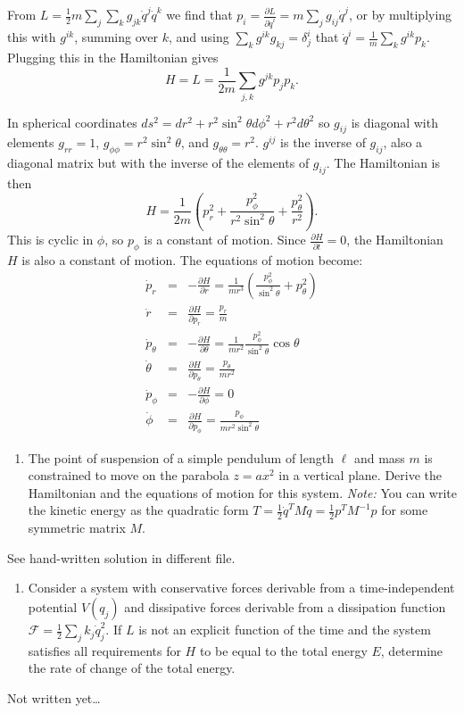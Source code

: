 \documentclass[letterpaper,11pt]{article}
\begin{document}
From $L = \frac{1}{2} m \sum_j \sum_k g_{jk} \dot{q}^j \dot{q}^k$ we find that $p_i = \frac{\partial L}{\partial \dot{q}^i} = m \sum_j g_{ij} \dot{q}^j$, or by multiplying this with $g^{ik}$, summing over $k$, and using $\sum_k g^{ik} g_{kj} = \delta^i_j$ that $\dot{q}^i = \frac{1}{m} \sum_k g^{ik} p_k$.  Plugging this in the Hamiltonian gives $$H = L = \frac{1}{2m} \sum_{j,k} g^{jk} p_j p_k.$$

In spherical coordinates $ds^2 = dr^2 + r^2 \sin^2\theta d\phi^2 + r^2 d\theta^2$ so $g_{ij}$ is diagonal with elements $g_{rr} = 1$, $g_{\phi\phi} = r^2 \sin^2\theta$, and $g_{\theta\theta} = r^2$.  $g^{ij}$ is the inverse of $g_{ij}$, also a diagonal matrix but with the inverse of the elements of $g_{ij}$.  The Hamiltonian is then $$H = \frac{1}{2m} (p_r^2 + \frac{p_\phi^2}{r^2\sin^2\theta} + \frac{p_\theta^2}{r^2}).$$  This is cyclic in $\phi$, so $p_\phi$ is a constant of motion.  Since $\frac{\partial H}{\partial t} = 0$, the Hamiltonian $H$ is also a constant of motion.  The equations of motion become:
\begin{eqnarray*}
 \dot{p}_r & = & -\frac{\partial H}{\partial r} = \frac{1}{mr^3}(\frac{p_\phi^2}{\sin^2\theta} + p_\theta^2) \\
 \dot{r} & = & \frac{\partial H}{\partial p_r} = \frac{p_r}{m} \\
 \dot{p}_\theta & = & -\frac{\partial H}{\partial \theta} =  \frac{1}{mr^2}\frac{p_\phi^2}{\sin^2\theta} \cos\theta \\
 \dot{\theta} & = & \frac{\partial H}{\partial p_\theta} = \frac{p_\theta}{m r^2} \\
 \dot{p}_\phi & = & -\frac{\partial H}{\partial \phi} = 0 \\
 \dot{\phi} & = & \frac{\partial H}{\partial p_\phi} = \frac{p_\phi}{m r^2 \sin^2\theta}
\end{eqnarray*}

\begin{enumerate}[resume]
 \item The point of suspension of a simple pendulum of length $\ell$ and mass $m$ is constrained to move on the parabola $z = a x^2$ in a vertical plane.  Derive the Hamiltonian and the equations of motion for this system.  \textit{Note:} You can write the kinetic energy as the quadratic form $T = \frac{1}{2} \dot{q}^T M \dot{q} = \frac{1}{2} p^T M^{-1} p$ for some symmetric matrix $M$.
\end{enumerate}
See hand-written solution in different file.

\begin{enumerate}[resume]
 \item Consider a system with conservative forces derivable from a time-independent potential $V(q_j)$ and dissipative forces derivable from a dissipation function $\mathcal{F} = \frac{1}{2}\sum_j k_j \dot{q}_j^2$.  If $L$ is not an explicit function of the time and the system satisfies all requirements for $H$ to be equal to the total energy $E$, determine the rate of change of the total energy.
\end{enumerate}
Not written yet\ldots
\end{document}
